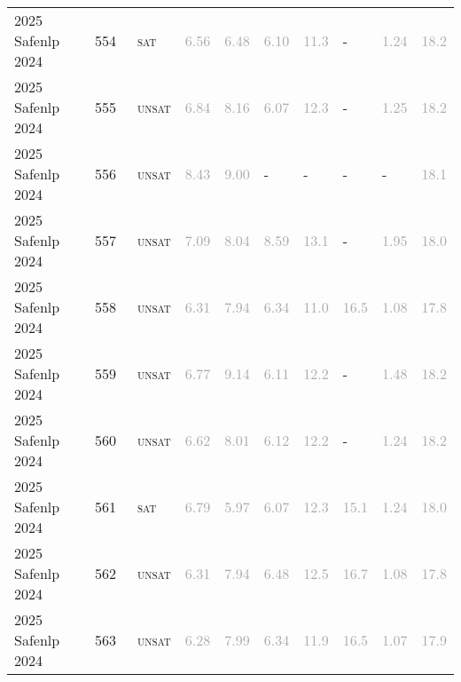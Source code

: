 \begin{center}
{\begin{longtable}{@{}llllllllll@{}}
2025 Safenlp 2024 & 554 & ~\textsc{sat} & \textcolor{darkgray}{6.56} & \textcolor{darkgray}{6.48} & \textcolor{darkgray}{6.10} & \textcolor{darkgray}{11.3} & - & \textcolor{darkgray}{1.24} & \textcolor{darkgray}{18.2} \\
2025 Safenlp 2024 & 555 & ~\textsc{unsat} & \textcolor{darkgray}{6.84} & \textcolor{darkgray}{8.16} & \textcolor{darkgray}{6.07} & \textcolor{darkgray}{12.3} & - & \textcolor{darkgray}{1.25} & \textcolor{darkgray}{18.2} \\
2025 Safenlp 2024 & 556 & ~\textsc{unsat} & \textcolor{darkgray}{8.43} & \textcolor{darkgray}{9.00} & - & - & - & - & \textcolor{darkgray}{18.1} \\
2025 Safenlp 2024 & 557 & ~\textsc{unsat} & \textcolor{darkgray}{7.09} & \textcolor{darkgray}{8.04} & \textcolor{darkgray}{8.59} & \textcolor{darkgray}{13.1} & - & \textcolor{darkgray}{1.95} & \textcolor{darkgray}{18.0} \\
2025 Safenlp 2024 & 558 & ~\textsc{unsat} & \textcolor{darkgray}{6.31} & \textcolor{darkgray}{7.94} & \textcolor{darkgray}{6.34} & \textcolor{darkgray}{11.0} & \textcolor{darkgray}{16.5} & \textcolor{darkgray}{1.08} & \textcolor{darkgray}{17.8} \\
2025 Safenlp 2024 & 559 & ~\textsc{unsat} & \textcolor{darkgray}{6.77} & \textcolor{darkgray}{9.14} & \textcolor{darkgray}{6.11} & \textcolor{darkgray}{12.2} & - & \textcolor{darkgray}{1.48} & \textcolor{darkgray}{18.2} \\
2025 Safenlp 2024 & 560 & ~\textsc{unsat} & \textcolor{darkgray}{6.62} & \textcolor{darkgray}{8.01} & \textcolor{darkgray}{6.12} & \textcolor{darkgray}{12.2} & - & \textcolor{darkgray}{1.24} & \textcolor{darkgray}{18.2} \\
2025 Safenlp 2024 & 561 & ~\textsc{sat} & \textcolor{darkgray}{6.79} & \textcolor{darkgray}{5.97} & \textcolor{darkgray}{6.07} & \textcolor{darkgray}{12.3} & \textcolor{darkgray}{15.1} & \textcolor{darkgray}{1.24} & \textcolor{darkgray}{18.0} \\
2025 Safenlp 2024 & 562 & ~\textsc{unsat} & \textcolor{darkgray}{6.31} & \textcolor{darkgray}{7.94} & \textcolor{darkgray}{6.48} & \textcolor{darkgray}{12.5} & \textcolor{darkgray}{16.7} & \textcolor{darkgray}{1.08} & \textcolor{darkgray}{17.8} \\
2025 Safenlp 2024 & 563 & ~\textsc{unsat} & \textcolor{darkgray}{6.28} & \textcolor{darkgray}{7.99} & \textcolor{darkgray}{6.34} & \textcolor{darkgray}{11.9} & \textcolor{darkgray}{16.5} & \textcolor{darkgray}{1.07} & \textcolor{darkgray}{17.9} \\

\end{longtable}}
\end{center}
